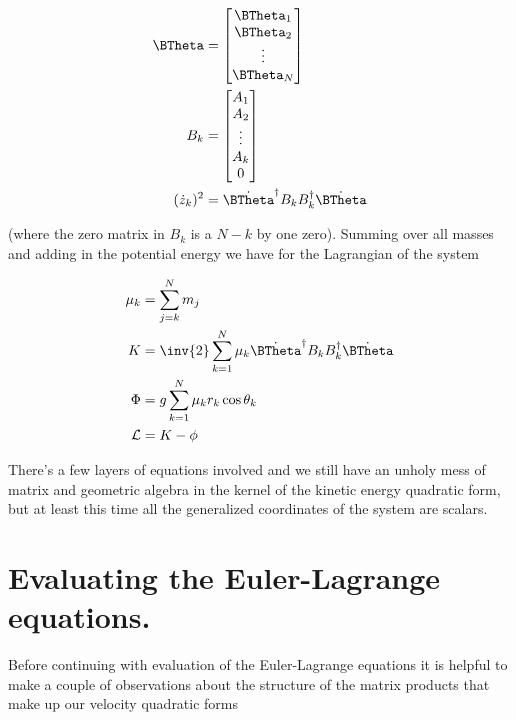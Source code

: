 \begin{align}\label{eqn:multiPendulumSpherical2:boo4}
\BTheta &=
\begin{bmatrix}
\BTheta_1 \\
\BTheta_2 \\
\vdots \\
\BTheta_N \\
\end{bmatrix} \\
B_k &=
\begin{bmatrix}
A_1 \\
A_2 \\
\vdots \\
A_k \\
0 \\
\end{bmatrix} \\
(\dot{z}_k)^2 &=
\dot{\BTheta}^\dagger B_k B_k^\dagger \dot{\BTheta}
\end{align}

(where the zero matrix in $B_k$ is a $N-k$ by one zero).  Summing over all masses and adding in the potential energy we have for the Lagrangian of the system


\begin{align}\label{eqn:multiPendulumSpherical2:boo5}
\mu_k &= \sum_{j=k}^N m_j \\
K &=
\inv{2} \sum_{k=1}^N \mu_k
\dot{\BTheta}^\dagger
B_k B_k^\dagger
\dot{\BTheta} \\
\Phi &=
g \sum_{k=1}^N \mu_k r_k \cos\theta_k \\
\LL &= K - \phi
\end{align}

There's a few layers of equations involved and we still have an unholy mess of matrix and geometric algebra in the kernel of the kinetic energy quadratic form, but at least this time all the generalized coordinates of the system are scalars.

\section{Evaluating the Euler-Lagrange equations.}

Before continuing with evaluation of the Euler-Lagrange equations it is helpful to make a couple of observations about the structure of the matrix products that make up our velocity quadratic forms


